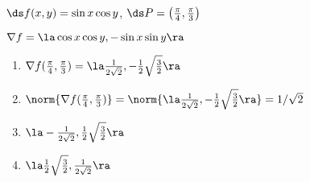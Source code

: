 {$\ds f(x,y) = \sin x\cos y$, $\ds P = \left(\frac{\pi}{4},\frac{\pi}{3}\right)$
}
{$\nabla f = \la \cos x\cos y, -\sin x\sin y\ra$
\begin{enumerate}
	\item $\nabla f(\frac{\pi}{4},\frac{\pi}{3}) = \la \frac{1}{2\sqrt{2}},-\frac12\sqrt{\frac32}\ra$
	\item	$\norm{\nabla f(\frac{\pi}{4},\frac{\pi}{3})} = \norm{\la \frac{1}{2\sqrt{2}},-\frac12\sqrt{\frac32}\ra} = 1/\sqrt{2} $
	\item $\la -\frac{1}{2\sqrt{2}},\frac12\sqrt{\frac32}\ra$
	\item $\la \frac12\sqrt{\frac32},\frac{1}{2\sqrt{2}}\ra$
\end{enumerate}
}